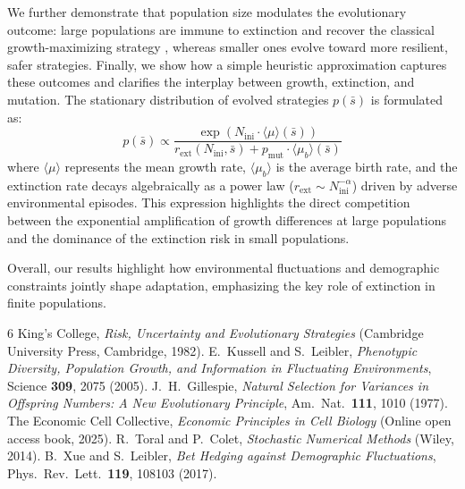 \documentclass[a4paper]{article}
\begin{document}
We further demonstrate that population size modulates the evolutionary outcome: large populations are immune to extinction and recover the classical growth-maximizing strategy \cite{gillespieNaturalSelectionVariances1977}, whereas smaller ones evolve toward more resilient, safer strategies. Finally, we show how a simple heuristic approximation captures these outcomes and clarifies the interplay between growth, extinction, and mutation. The stationary distribution of evolved strategies $p(\bar{s})$ is formulated as:
\begin{equation} \label{eq:heuristic_distribution}
    p(\bar{s})\propto\frac{\exp(N_\text{ini}\cdot\langle\mu\rangle(\bar{s}))}{r_\text{ext}(N_\text{ini},\bar{s})+p_\text{mut}\cdot\langle\mu_b\rangle(\bar{s})}
\end{equation}
where $\langle\mu\rangle$ represents the mean growth rate, $\langle\mu_b\rangle$ is the average birth rate, and the extinction rate decays algebraically as a power law ($r_{\text{ext}} \sim N_{\text{ini}}^{-\alpha}$) driven by adverse environmental episodes. This expression highlights the direct competition between the exponential amplification of growth differences at large populations and the dominance of the extinction risk in small populations.

Overall, our results highlight how environmental fluctuations and demographic constraints jointly shape adaptation, emphasizing the key role of extinction in finite populations.

\footnotesize
\begin{thebibliography}{6}
     King's College, \emph{Risk, Uncertainty and Evolutionary Strategies} (Cambridge University Press, Cambridge, 1982).
     E.~Kussell and S.~Leibler, \emph{Phenotypic Diversity, Population Growth, and Information in Fluctuating Environments}, Science \textbf{309}, 2075 (2005).
     J.~H.~Gillespie, \emph{Natural Selection for Variances in Offspring Numbers: A New Evolutionary Principle}, Am.\ Nat.\ \textbf{111}, 1010 (1977).
     The Economic Cell Collective, \emph{Economic Principles in Cell Biology} (Online open access book, 2025).
     R.~Toral and P.~Colet, \emph{Stochastic Numerical Methods} (Wiley, 2014).
     B.~Xue and S.~Leibler, \emph{Bet Hedging against Demographic Fluctuations}, Phys.\ Rev.\ Lett.\ \textbf{119}, 108103 (2017).
\end{thebibliography}
\end{document}
